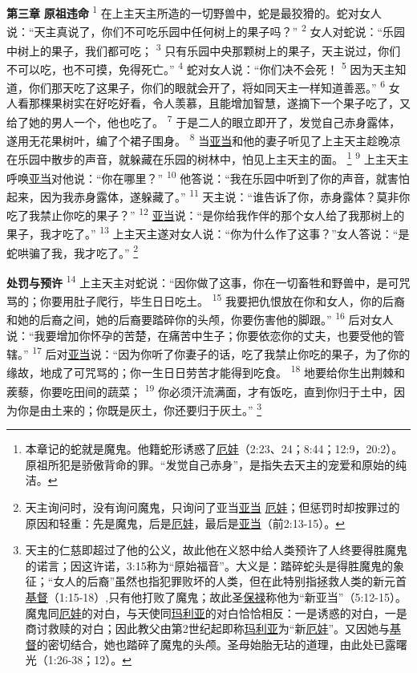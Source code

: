 \textbf{第三章 }
\textbf{原祖违命 }
\textsuperscript{1}
在上主天主所造的一切野兽中，蛇是最狡猾的。蛇对女人说：“天主真说了，你们不可吃乐园中任何树上的果子吗？”
\textsuperscript{2}
女人对蛇说：“乐园中树上的果子，我们都可吃；
\textsuperscript{3}
只有乐园中央那颗树上的果子，天主说过，你们不可以吃，也不可摸，免得死亡。”
\textsuperscript{4}
蛇对女人说：“你们决不会死！
\textsuperscript{5}
因为天主知道，你们那天吃了这果子，你们的眼就会开了，将如同天主一样知道善恶。”
\textsuperscript{6}
女人看那棵果树实在好吃好看，令人羡慕，且能增加智慧，遂摘下一个果子吃了，又给了她的男人一个，他也吃了。
\textsuperscript{7}
于是二人的眼立即开了，发觉自己赤身露体，遂用无花果树叶，编了个裙子围身。
\textsuperscript{8}
当\uline{亚当}和他的妻子听见了上主天主趁晚凉在乐园中散步的声音，就躲藏在乐园的树林中，怕见上主天主的面。
\footnote{本章记的蛇就是魔鬼。他籍蛇形诱惑了\uline{厄娃}（2:23、24；8:44；12:9，20:2）。原祖所犯是骄傲背命的罪。“发觉自己赤身”，是指失去天主的宠爱和原始的纯洁。}
\textsuperscript{9}
上主天主呼唤\uline{亚当}对他说：“你在哪里？”
\textsuperscript{10}
他答说：“我在乐园中听到了你的声音，就害怕起来，因为我赤身露体，遂躲藏了。”
\textsuperscript{11}
天主说：“谁告诉了你，赤身露体？莫非你吃了我禁止你吃的果子？”
\textsuperscript{12}
\uline{亚当}说：“是你给我作伴的那个女人给了我那树上的果子，我才吃了。”
\textsuperscript{13}
上主天主遂对女人说：“你为什么作了这事？”女人答说：“是蛇哄骗了我，我才吃了。”
\footnote{天主询问时，没有询问魔鬼，只询问了亚当\uline{亚当} \uline{厄娃}；但惩罚时却按罪过的原因和轻重：先是魔鬼，后是\uline{厄娃}，最后是\uline{亚当}（前2:13-15）。}

\textbf{处罚与预许 }
\textsuperscript{14}
上主天主对蛇说：“因你做了这事，你在一切畜牲和野兽中，是可咒骂的；你要用肚子爬行，毕生日日吃土。
\textsuperscript{15}
我要把仇恨放在你和女人，你的后裔和她的后裔之间，她的后裔要踏碎你的头颅，你要伤害他的脚跟。”
\textsuperscript{16}
后对女人说：“我要增加你怀孕的苦楚，在痛苦中生子；你要依恋你的丈夫，也要受他的管辖。”
\textsuperscript{17}
后对\uline{亚当}说：“因为你听了你妻子的话，吃了我禁止你吃的果子，为了你的缘故，地成了可咒骂的；你一生日日劳苦才能得到吃食。
\textsuperscript{18}
地要给你生出荆棘和蒺藜，你要吃田间的蔬菜；
\textsuperscript{19}
你必须汗流满面，才有饭吃，直到你归于土中，因为你是由土来的；你既是灰土，你还要归于灰土。”
\footnote{天主的仁慈即超过了他的公义，故此他在义怒中给人类预许了人终要得胜魔鬼的诺言；因这许诺，3:15称为“原始福音”。大义是：踏碎蛇头是得胜魔鬼的象征；“女人的后裔”虽然也指犯罪败坏的人类，但在此特别指拯救人类的新元首\uline{基督}（1:15-18）,只有他打败了魔鬼；故此圣\uline{保禄}称他为“新亚当”（5:12-15）。魔鬼同\uline{厄娃}的对白，与天使同\uline{玛利亚}的对白恰恰相反：一是诱惑的对白，一是商讨救赎的对白；因此教父由第2世纪起即称\uline{玛利亚}为“新\uline{厄娃}”。又因她与\uline{基督}的密切结合，她也踏碎了魔鬼的头颅。圣母始胎无玷的道理，由此处已露曙光（1:26-38；12）。}

